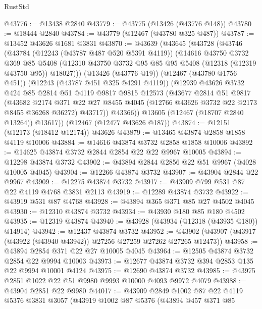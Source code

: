 \begin{lexlean}{RustStd}
\begin{coremodule}
@43776 := @13438 @2840
@43779 := @43775 (@13426 (@43776 @148))
@43780 := @18444 @2840
@43784 := @43779 (@12467 (@43780 @325 @487))
@43787 := @13452 @43626 @1681 @3831
@43870 := @43639
    (@43645
      (@43728
        (@43746
          (@43784
            (@12243 (@43787 @487 @520 @5391 @4119))
            (@14616
              @43750
              @3732
              @369
              @85
              @5408
              (@12310 @43750 @3732 @95 @85 @95 @5408 (@12318 (@12319 @43750 @95)) @18027)))
          (@13426 (@43776 @19))
          (@12467 (@43780 @1756 @451))
          (@12243 (@43787 @451 @325 @4291 @4119))
          (@12939
            @43626
            @3732
            @424
            @85
            @2814
            @51
            @4119
            @9817
            @9815
            @12573
            (@43677
              @2814
              @51
              @9817
              (@43682
                @2174
                @371
                @22
                @27
                @8455
                @4045
                (@12766 @43626 @3732 @22 @2173 @8455 @36268 @36272)
                @43717))
            @43366))
        @13605
        (@12467 (@18707 @2840 @13264))
        @13617))
    (@12467 (@12477 @43626 @187))
@43874 := @12151 (@12173 (@18412 @12174)) @43626
@43879 := @13465 @43874 @2858 @1858 @4119 @10006
@43884 := @14616 @43874 @3732 @2858 @1858 @10006
@43892 := @14625 @43874 @3732 @2844 @2854 @22 @22 @9967 @10005
@43894 := @12298 @43874 @3732
@43902 := @43894 @2844 @2856 @22 @51 @9967 (@4028 @10005 @4045)
@43904 := @12266 @43874 @3732
@43907 := @43904 @2844 @22 @9967
@43909 := @12275 @43874 @3732
@43917 := @43909 @799 @531 @87 @22 @4119 @4768 @3831 @2113
@43919 := @12289 @43874 @3732
@43922 := @43919 @531 @87 @4768
@43928 := @43894 @365 @371 @85 @27 @4502 @4045
@43930 := @12310 @43874 @3732
@43934 := @43930 @180 @85 @180 @4502
@43935 := @12319 @43874
@43940 := @43928 (@43934 (@12318 (@43935 @180)) @14914)
@43942 := @12437 @43874 @3732
@43952 := @43902 (@43907 (@43917 (@43922 (@43940 @43942)) @27256 @27259 @27262 @27265 @12473))
@43958 := @43894 @2854 @371 @22 @27 @10005 @4045
@43964 := @12505 @43874 @3732 @2854 @22 @9994 @10003
@43973 := @12677 @43874 @3732 @394 @2853 @135 @22 @9994 @10001 @4124
@43975 := @12690 @43874 @3732
@43985 := @43975 @2851 @1022 @22 @51 @9980 @9993 @10000 @4093 @9972 @4079
@43988 := @43904 @2851 @22 @9980
@44017 := @43909
    @2849
    @1002
    @87
    @22
    @4119
    @5376
    @3831
    @3057
    (@43919
      @1002
      @87
      @5376
      (@43894
        @457
        @371
        @85

\end{coremodule}
\end{lexlean}
